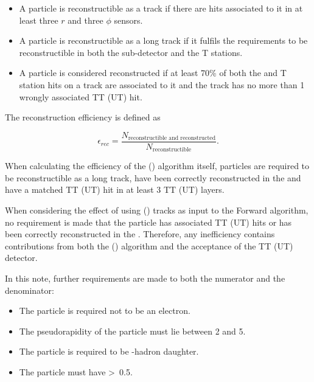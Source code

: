 \begin{itemize}

\item A particle is reconstructible as a \velo track if there are hits associated to it in at least three $r$ and three $\phi$ \velo sensors.

\item A particle is reconstructible as a long track if it fulfils the requirements to be reconstructible in both the \velo sub-detector and the T stations.

\item A particle is considered reconstructed if at least 70\% of both the \velo and T station hits on a track are associated to it and the track has no more than 1 wrongly associated TT (UT) hit.

\end{itemize}

\noindent The reconstruction efficiency is defined as

\begin{equation}
\epsilon_{rec} = \frac{N_{\text{reconstructible~and~reconstructed}}}{N_{\text{reconstructible}}}.
\end{equation}

When calculating the efficiency of the \velott (\velout) algorithm itself, particles are required to be reconstructible as a long track, have been correctly reconstructed in the \velo and have a matched TT (UT) hit in at least 3 TT (UT) layers. 

When considering the effect of using \velott (\velout) tracks as input to the Forward algorithm, no requirement is made that the particle has associated TT (UT) hits or has been correctly reconstructed in the \velo. Therefore, any inefficiency contains contributions from both the \velott (\velout) algorithm and the acceptance of the TT (UT) detector. 

In this note, further requirements are made to both the numerator and the denominator:

\begin{itemize}
\item The particle is required not to be an electron.
\item The pseudorapidity of the particle must lie between 2 and 5.
\item The particle is required to be \bquark-hadron daughter.
\item The particle must have \pt\textgreater~0.5\gevc.
\end{itemize}


